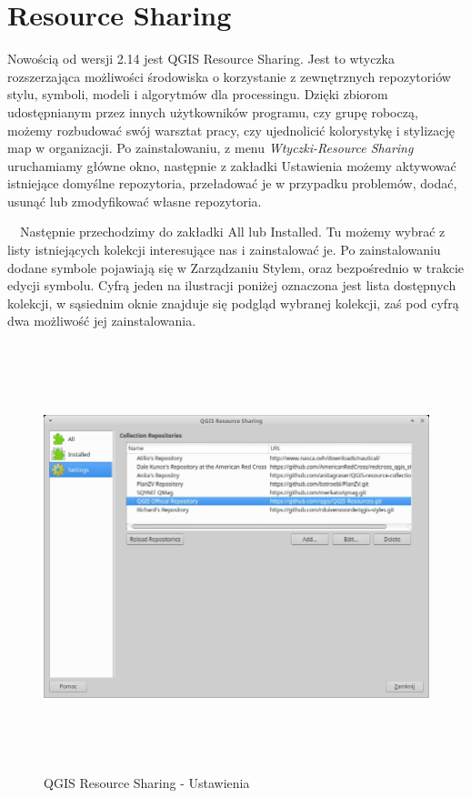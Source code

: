 \documentclass[12pt,a4paper]{book}
\begin{document}
\section{Resource Sharing}
Nowością od wersji 2.14 jest QGIS Resource Sharing. Jest to wtyczka rozszerzająca możliwości środowiska o korzystanie z zewnętrznych repozytoriów stylu, symboli, modeli i algorytmów dla processingu.  Dzięki zbiorom udostępnianym przez innych użytkowników programu, czy grupę roboczą, możemy rozbudować swój warsztat pracy, czy ujednolicić kolorystykę i stylizację map w organizacji. Po zainstalowaniu, z menu \textit{Wtyczki-Resource Sharing }uruchamiamy główne okno, następnie z zakładki Ustawienia możemy aktywować istniejące domyślne repozytoria, przeładować je w przypadku problemów, dodać, usunąć lub zmodyfikować własne repozytoria. 

\ \ Następnie przechodzimy do zakładki All lub Installed. Tu możemy wybrać z listy istniejących kolekcji interesujące nas i zainstalować je. Po zainstalowaniu dodane symbole pojawiają się w Zarządzaniu Stylem, oraz bezpośrednio w trakcie edycji symbolu.  Cyfrą jeden na ilustracji poniżej oznaczona jest lista dostępnych kolekcji, w sąsiednim oknie znajduje się podgląd wybranej kolekcji, zaś pod cyfrą dwa możliwość jej zainstalowania.

\begin{center}
\begin{figure}
\includegraphics[width=16.916cm,height=12.407cm]{007-qrs-u.jpg}
\caption{QGIS Resource Sharing - Ustawienia}
\end{figure}
\end{center}
\end{document}
